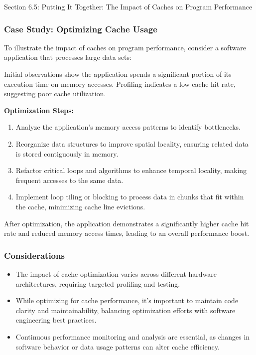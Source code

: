 \begin{notes}{Section 6.5: Putting It Together: The Impact of Caches on Program Performance}
    \vspace*{1em}
    
    \subsubsection*{Case Study: Optimizing Cache Usage}
    
    To illustrate the impact of caches on program performance, consider a software application that processes large data sets:
    
    \begin{highlight}
        Initial observations show the application spends a significant portion of its execution time on memory accesses. Profiling indicates a low cache hit rate, suggesting poor cache utilization.
    
        \textbf{Optimization Steps:}
        \begin{enumerate}
            \item Analyze the application's memory access patterns to identify bottlenecks.
            \item Reorganize data structures to improve spatial locality, ensuring related data is stored contiguously in memory.
            \item Refactor critical loops and algorithms to enhance temporal locality, making frequent accesses to the same data.
            \item Implement loop tiling or blocking to process data in chunks that fit within the cache, minimizing cache line evictions.
        \end{enumerate}
    
        After optimization, the application demonstrates a significantly higher cache hit rate and reduced memory access times, leading to an overall performance boost.
    \end{highlight}
    
    \subsubsection*{Considerations}
    
    \begin{itemize}
        \item The impact of cache optimization varies across different hardware architectures, requiring targeted profiling and testing.
        \item While optimizing for cache performance, it's important to maintain code clarity and maintainability, balancing optimization efforts with software engineering best practices.
        \item Continuous performance monitoring and analysis are essential, as changes in software behavior or data usage patterns can alter cache efficiency.
    \end{itemize}    
\end{notes}